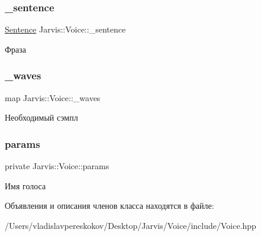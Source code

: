 \subsubsection{\texorpdfstring{\+\_\+sentence}{\_sentence}}
{\footnotesize\ttfamily \hyperlink{classJarvis_1_1Sentence}{Sentence} Jarvis\+::\+Voice\+::\+\_\+sentence}

Фраза \mbox{\label{classJarvis_1_1Voice_a70bc48a33f97bd1cf3b43e08824a041c}} 
\subsubsection{\texorpdfstring{\+\_\+waves}{\_waves}}
{\footnotesize\ttfamily map Jarvis\+::\+Voice\+::\+\_\+waves}

Необходимый сэмпл \mbox{\label{classJarvis_1_1Voice_a23e07f1f4dfbe872ff95b53e32bad443}} 
\subsubsection{\texorpdfstring{params}{params}}
{\footnotesize\ttfamily private Jarvis\+::\+Voice\+::params}

Имя голоса 

Объявления и описания членов класса находятся в файле\+:\begin{DoxyCompactItemize}
\item 
/\+Users/vladislavpereskokov/\+Desktop/\+Jarvis/\+Voice/include/Voice.\+hpp\end{DoxyCompactItemize}
